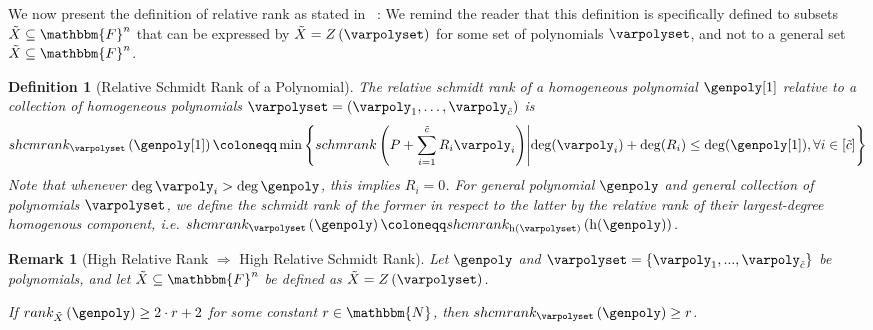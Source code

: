 \documentclass[10pt,a4paper]{article}
\newtheorem{definition}[theorem]{Definition}
\newtheorem{remark}[theorem]{Remark}
\newcommand{\definedas}[0]{\coloneqq}
\newcommand{\parens}[1]{\left( #1 \right)}
\newcommand{\set}[1]{\left\{ #1 \right\}}
\newcommand{\suchthat}[0]{\middle|}
\newcommand{\basefield}[0]{\mathbbm{F}}
\newcommand{\blocklength}[0]{n}
\newcommand{\field}[0]{\basefield^{\blocklength}}
\newcommand{\series}[3]{#1_{#2},\ldots,#1_{#3}}
\newcommand{\naturalnumbersset}[0]{\mathbbm{N}}
\newcommand{\remainderpoly}[0]{R}
\newcommand{\variety}{{\tilde{X}}}
\newcommand{\varietypolycount}{{\tilde{c}}}
\newcommand{\homopart}[1]{\mathrm{h}({#1})}
\newcommand{\zerofunc}[1]{Z \parens{#1}}
\newcommand{\schmrank}[1]{schmrank \parens{#1}}
\newcommand{\relschmrank}[2]{shcmrank_{#1}\parens{{#2}}}
\newcommand{\relrank}[2]{rank_{#1} \parens{#2}}
\newcommand{\rankval}[0]{{{r}}}
\begin{document}
We now present the definition of relative rank as stated in ~\cite[Definition 1.6]{lampert2021relative}:
We remind the reader that this definition is specifically defined to subsets $\variety \subseteq \field$ that can be expressed by $\variety = \zerofunc{\varpolyset}$ for some set of polynomials $\varpolyset$, and not to a general set $\variety \subseteq \field$.
\begin{definition}[Relative Schmidt Rank of a Polynomial]
    The relative schmidt rank of a homogeneous polynomial $\genpoly[1]$ relative to a collection of homogeneous polynomials $\varpolyset=(\series{\varpoly}{1}{\varietypolycount})$ is
    \[
        \relschmrank{\varpolyset}{\genpoly[1]} \definedas
        \min \set{\schmrank{P+\sum_{i=1}^{\varietypolycount}{\remainderpoly_{i}\varpoly_{i}}}
            \suchthat
            \deg(\varpoly_{i})+\deg(\remainderpoly_{i}) \leq \deg(\genpoly[1]), \forall i \in [\varietypolycount]}
    \]
    Note that whenever $\deg{\varpoly_{i}}>\deg{\genpoly}$, this implies $\remainderpoly_{i}=0$.
    \newline
    For general polynomial $\genpoly$ and general collection of polynomials $\varpolyset$, we define
    the schmidt rank of the former in respect to the latter by the relative rank of their largest-degree homogenous component,
    i.e. $\relschmrank{\varpolyset}{\genpoly} \definedas \relschmrank{\homopart{\varpolyset}}{\homopart{\genpoly}}$.
\end{definition}
\begin{remark}[High Relative Rank $\Rightarrow$ High Relative Schmidt Rank]\label{remark-high-relative-rank-implies-high-relative-schmidt-rank}
    Let $\genpoly$ and $\varpolyset = \set{\varpoly_1,...,\varpoly_{\varietypolycount}}$ be polynomials,
    and let $\variety \subseteq \field$ be defined as $\variety = \zerofunc{\varpolyset}$.

    If $\relrank{\variety}{\genpoly} \geq 2 \cdot \rankval + 2$ for some constant $\rankval \in \naturalnumbersset$,
    then $\relschmrank{\varpolyset}{\genpoly} \geq r$.
\end{remark}
\end{document}
